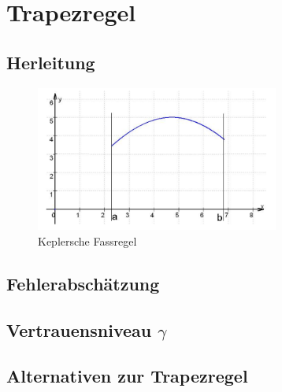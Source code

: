 
\section{Trapezregel}
\label{sec:trapezregel}

\subsection{Herleitung}
\label{sec:herleitung}

\begin{figure}[h]
    \centering
    \includegraphics[width=8cm]{Bilder/keplersche_fassregel_funktion.png}
    \caption{Keplersche Fassregel \cite{skript}}    
    \label{fig:keplersche_fassregel}
    \end{figure}

\subsection{Fehlerabschätzung}
\label{sec:fehlerabschätzung}

\subsection{Vertrauensniveau $\gamma$}
\label{sec:vertrauensniveau}

\subsection{Alternativen zur Trapezregel} 
\label{sec:alternativen}
